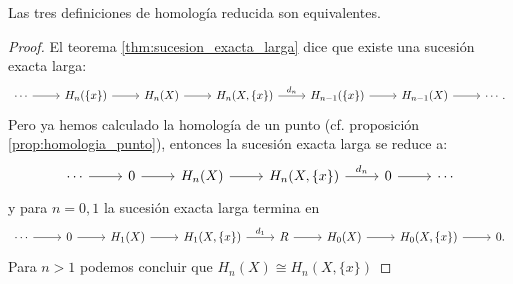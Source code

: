\begin{ejercicio}\label{ej:75}
  Las tres definiciones de homolog\'ia reducida son equivalentes.
\end{ejercicio}
\begin{proof}%
  El teorema \ref{thm:sucesion_exacta_larga} dice que existe una sucesi\'on exacta larga:
  \[
    \begin{tikzcd}
      \cdots \arrow[r] & H_n(\{x\}) \arrow[r] & H_n(X) \arrow[r] & H_n(X,\{x\})\arrow[r,"d_n"] &
      H_{n-1}(\{x\}) \arrow[r] & H_{n-1}(X) \arrow[r] & \cdots.
    \end{tikzcd}
  \]
  Pero ya hemos calculado la homolog\'ia de un punto (cf. proposici\'on \ref{prop:homologia_punto}),
  entonces la sucesi\'on exacta larga se reduce a:
  \[
    \begin{tikzcd}
      \cdots \arrow[r] & 0 \arrow[r] & H_n(X) \arrow[r] & H_n(X,\{x\})\arrow[r,"d_n"] &
      0 \arrow[r] & \cdots
    \end{tikzcd}
  \]
  y para $n=0,1$ la sucesi\'on exacta larga termina en
  \[
    \begin{tikzcd}
      \cdots \arrow[r] & 0 \arrow[r] & H_1(X) \arrow[r]&
      H_1(X,\{x\}) \arrow[r,"d_1"] & R \arrow[r] & H_0(X) \arrow[r] & H_0(X,\{x\}) \arrow[r] & 0.
    \end{tikzcd}
  \]
  Para $n>1$ podemos concluir que $H_n(X)\cong H_n(X,\{x\})$
\end{proof}%

